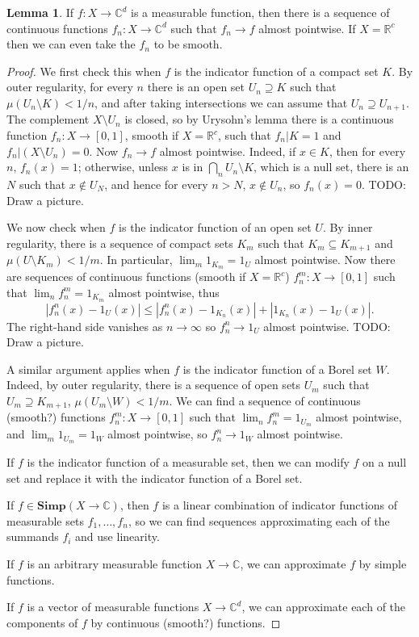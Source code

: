 \documentclass[12pt]{book}
\newcommand{\RR}{\mathbb{R}}
\newcommand{\CC}{\mathbb{C}}
\newcommand{\Simp}{\mathbf{Simp}}
\theoremstyle{definition}
\newtheorem{lemma}[theorem]{Lemma}
\begin{document}
\begin{lemma}
\label{smooth functions are pointwise dense}
If $f: X \to \CC^d$ is a measurable function, then there is a sequence of continuous functions $f_n: X \to \CC^d$ such that $f_n \to f$ almost pointwise.
If $X = \RR^c$ then we can even take the $f_n$ to be smooth.
\end{lemma}
\begin{proof}
We first check this when $f$ is the indicator function of a compact set $K$.
By outer regularity, for every $n$ there is an open set $U_n \supseteq K$ such that $\mu(U_n \setminus K) < 1/n$, and after taking intersections we can assume that $U_n \supseteq U_{n+1}$.
The complement $X \setminus U_n$ is closed, so by Urysohn's lemma there is a continuous function $f_n: X \to [0, 1]$, smooth if $X = \RR^c$, such that $f_n|K = 1$ and $f_n|(X \setminus U_n) = 0$.
Now $f_n \to f$ almost pointwise. Indeed, if $x \in K$, then for every $n$, $f_n(x) = 1$; otherwise, unless $x$ is in $\bigcap_n U_n \setminus K$, which is a null set, there is an $N$ such that $x \notin U_N$, and hence for every $n > N$, $x \notin U_n$, so $f_n(x) = 0$.
TODO: Draw a picture.

We now check when $f$ is the indicator function of an open set $U$.
By inner regularity, there is a sequence of compact sets $K_m$ such that $K_m \subseteq K_{m+1}$ and $\mu(U \setminus K_m) < 1/m$.
In particular, $\lim_m 1_{K_m} = 1_U$ almost pointwise.
Now there are sequences of continuous functions (smooth if $X = \RR^c$) $f_n^m: X \to [0, 1]$ such that $\lim_n f_n^m = 1_{K_m}$ almost pointwise, thus
$$|f_n^n(x) - 1_U(x)| \leq |f_n^n(x) - 1_{K_n}(x)| + |1_{K_n}(x) - 1_U(x)|.$$
The right-hand side vanishes as $n \to \infty$ so $f_n^n \to 1_U$ almost pointwise.
TODO: Draw a picture.

A similar argument applies when $f$ is the indicator function of a Borel set $W$.
Indeed, by outer regularity, there is a sequence of open sets $U_m$ such that $U_m \supseteq K_{m+1}$, $\mu(U_m \setminus W) < 1/m$.
We can find a sequence of continuous (smooth?) functions $f_n^m: X \to [0, 1]$ such that $\lim_n f_n^m = 1_{U_m}$ almost pointwise, and $\lim_m 1_{U_m} = 1_W$ almost pointwise, so $f_n^n \to 1_W$ almost pointwise.

If $f$ is the indicator function of a measurable set, then we can modify $f$ on a null set and replace it with the indicator function of a Borel set.

If $f \in \Simp(X \to \CC)$, then $f$ is a linear combination of indicator functions of measurable sets $f_1, \dots, f_n$, so we can find sequences approximating each of the summands $f_i$ and use linearity.

If $f$ is an arbitrary measurable function $X \to \CC$, we can approximate $f$ by simple functions.

If $f$ is a vector of measurable functions $X \to \CC^d$, we can approximate each of the components of $f$ by continuous (smooth?) functions.
\end{proof}
\end{document}
